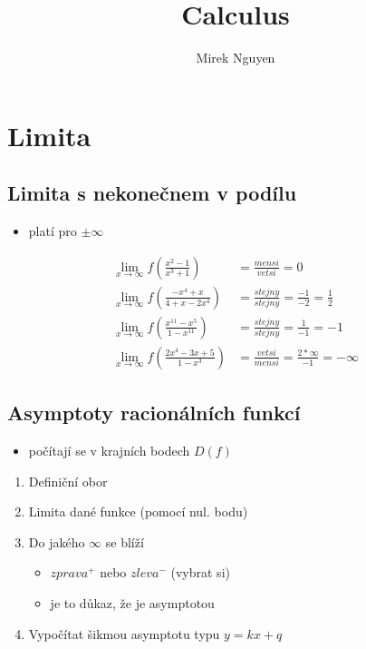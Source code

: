 \documentclass{article}
\begin{document}
\title{Calculus}
\author{Mirek Nguyen}
\date{}

\maketitle
\tableofcontents

\clearpage
\section{Limita}
\subsection{Limita s nekonečnem v podílu}
\begin{itemize}
  \item platí pro $\pm\infty$
\end{itemize}
\begin{align*}
  \lim_{x \to \infty}f(\frac{x^2-1}{x^3+1})&=\frac{mensi}{vetsi}=0 \\
  \lim_{x \to \infty}f(\frac{-x^4+x}{4+x-2x^4})&=\frac{stejny}{stejny}=\frac{-1}{-2}=\frac{1}{2} \\
  \lim_{x \to \infty}f(\frac{x^{11}-x^5}{1-x^{11}})&=\frac{stejny}{stejny}=\frac{1}{-1}=-1 \\
  \lim_{x \to \infty}f(\frac{2x^4-3x+5}{1-x^3})&=\frac{vetsi}{mensi}=\frac{2*\infty}{-1}=-\infty
\end{align*}


\subsection{Asymptoty racionálních funkcí}
\begin{itemize}
  \item počítají se v krajních bodech $D(f)$
\end{itemize}
\begin{enumerate}
  \item Definiční obor
  \item Limita dané funkce (pomocí nul. bodu)
  \item Do jakého $\infty$ se blíží
    \begin{itemize}
      \item $zprava^+$ nebo $zleva^-$ (vybrat si)
      \item je to důkaz, že je asymptotou
    \end{itemize}
  \item Vypočítat šikmou asymptotu typu $y=kx+q$
\end{enumerate}
\end{document}
